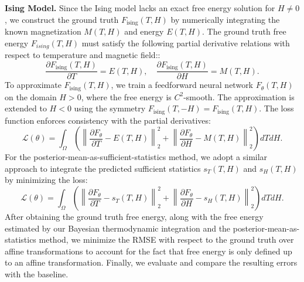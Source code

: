 \documentclass{article}
\theoremstyle{plain}
\theoremstyle{definition}
\theoremstyle{remark}
\begin{document}
\textbf{Ising Model.} Since the Ising model lacks an exact free energy solution for $H \neq 0$, we construct the ground truth $F_{\text{ising}}(T, H)$ by numerically integrating the known magnetization $M(T, H)$ and energy $E(T, H)$. The ground truth free energy $F_{ising}(T, H)$ must satisfy the following partial derivative relations with respect to temperature and magnetic field::
\begin{equation}
    \frac{\partial F_{\text{ising}}(T, H)}{\partial T} = E(T, H), \quad
    \frac{\partial F_{\text{ising}}(T, H)}{\partial H} = M(T, H).
\end{equation}
To approximate $F_{\text{ising}}(T, H)$, we train a feedforward neural network $F_{\theta}(T, H)$ on the domain $H > 0$, where the free energy is $C^2$-smooth. The approximation is extended to $H < 0$ using the symmetry $F_{\text{ising}}(T, -H) = F_{\text{ising}}(T, H)$. The loss function enforces consistency with the partial derivatives:
\begin{equation}
    \mathcal{L}(\theta) = \int_{\Omega} \left( \left\| \frac{\partial F_{\theta}}{\partial T} - E(T, H) \right\|_{2}^{2} + \left\| \frac{\partial F_{\theta}}{\partial H} - M(T, H) \right\|_{2}^{2} \right) dT dH.
\end{equation}
For the posterior-mean-as-sufficient-statistics method, we adopt a similar approach to integrate the predicted sufficient statistics $s_{T}(T, H)$ and $s_{H}(T,H)$ by minimizing the loss:
\begin{equation}
    \mathcal{L}(\theta) = \int_{\Omega}\left(\left\| \frac{\partial F_{\theta}}{\partial T}-s_{T}(T, H)\right\|^{2}_{2} + \left\| \frac{\partial F_{\theta}}{\partial H}-s_{H}(T, H)\right\|^{2}_{2} \right) dT dH.
\end{equation}
After obtaining the ground truth free energy, along with the free energy estimated by our Bayesian thermodynamic
integration and the posterior-mean-as-statistics method, we minimize the RMSE with respect to the ground truth over affine transformations to account for the fact that free energy is only defined up to an affine transformation. Finally, we evaluate and compare the resulting errors with the baseline.
\end{document}
